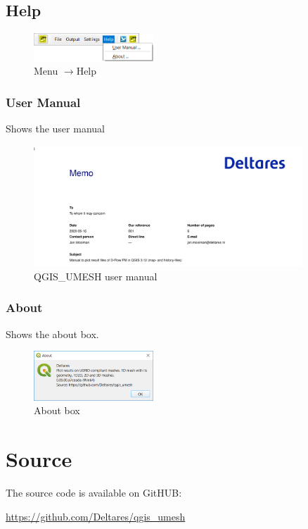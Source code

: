 \documentclass{deltares_memo}
\newcommand{\menuarrow}{$\rightarrow$}
\newcommand{\qumesh}{QGIS\_UMESH\xspace}
\begin{document}
\subsection{Help}
\phantom{m}\vspace{-\baselineskip}
\begin{figure}[H]
    \centering    
    \includegraphics[width=0.4\textwidth]{pictures/menu_help.png}
    \caption{Menu \menuarrow Help}
\end{figure}

\subsubsection{User Manual}
Shows the user manual
\begin{figure}[H]
	\centering    
	\includegraphics[width=0.9\textwidth]{pictures/menu_help_user_manual.png}
	\caption{\qumesh user manual}
\end{figure}

\subsubsection{About}
Shows the about box.
\begin{figure}[H]
    \centering    
    \includegraphics[width=0.4\textwidth]{pictures/menu_help_about.png}
    \caption{About box}
\end{figure}
\section{Source}
The source code is available on GitHUB:

\url{https://github.com/Deltares/qgis_umesh}
\end{document}
